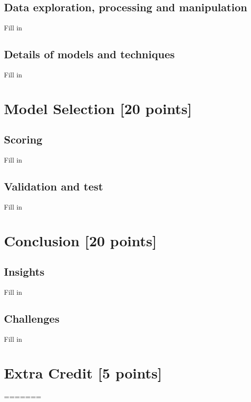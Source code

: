 \subsection{Data exploration, processing and manipulation}
Fill in

\subsection{Details of models and techniques}
Fill in

\newpage

\section{Model Selection [20 points]}
\subsection{Scoring}
Fill in

\subsection{Validation and test}
Fill in

\newpage

\section{Conclusion [20 points]}
\subsection{Insights}
Fill in

\subsection{Challenges}
Fill in
\newpage

\section{Extra Credit [5 points]}



=======
\newif\ifshowsolutions
\showsolutionstrue








